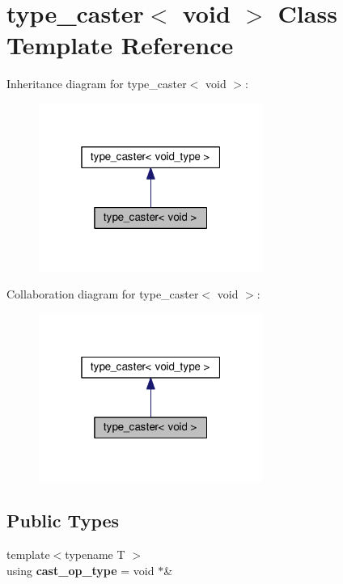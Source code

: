 \hypertarget{classtype__caster_3_01void_01_4}{}\section{type\+\_\+caster$<$ void $>$ Class Template Reference}
\label{classtype__caster_3_01void_01_4}


Inheritance diagram for type\+\_\+caster$<$ void $>$\+:
\nopagebreak
\begin{figure}[H]
\begin{center}
\leavevmode
\includegraphics[width=208pt]{classtype__caster_3_01void_01_4__inherit__graph}
\end{center}
\end{figure}


Collaboration diagram for type\+\_\+caster$<$ void $>$\+:
\nopagebreak
\begin{figure}[H]
\begin{center}
\leavevmode
\includegraphics[width=208pt]{classtype__caster_3_01void_01_4__coll__graph}
\end{center}
\end{figure}
\subsection*{Public Types}
\begin{DoxyCompactItemize}
\item 
{\footnotesize template$<$typename T $>$ }\\using {\bfseries cast\+\_\+op\+\_\+type} = void $\ast$\&\hypertarget{classtype__caster_3_01void_01_4_a334e9bada1b4be4c9b42fe4f1e1784a4}{}\label{classtype__caster_3_01void_01_4_a334e9bada1b4be4c9b42fe4f1e1784a4}

\end{DoxyCompactItemize}
